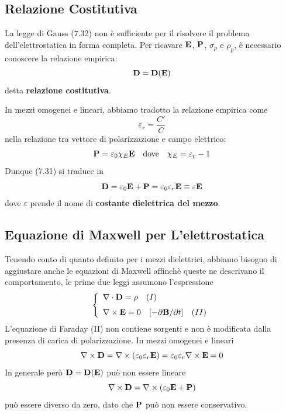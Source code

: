 \subsection{Relazione Costitutiva}

La legge di Gauss (7.32) non \`e sufficiente per il risolvere il problema dell'elettrostatica in forma completa. Per ricavare $\bold{E}$, $\bold{P}$, $\sigma_p$ e $\rho_p$, \`e necessario conoscere la relazione empirica:
\begin{equation*}
	\bold{D} = \bold{D}(\bold{E})
\end{equation*}
detta \textbf{relazione costitutiva}.

In mezzi omogenei e lineari, abbiamo tradotto la relazione empirica come 
\begin{equation*}
	\varepsilon_{r} = \frac{C'}{C}
\end{equation*}
nella relazione tra vettore di polarizzazione e campo elettrico:
\begin{equation*}
	\bold{P} = \varepsilon_0 \chi_{E} \bold{E} \quad \text{dove} \quad \chi_{E} = \varepsilon_{r} -1
\end{equation*}
Dunque (7.31) si traduce in 
\begin{equation*}
	\bold{D} = \varepsilon_0 \bold{E} + \bold{P} = \varepsilon_0 \varepsilon_r \bold{E} \equiv \varepsilon \bold{E}
\end{equation*}
dove $\varepsilon$ prende il nome di \textbf{costante dielettrica del mezzo}.

\subsection{Equazione di Maxwell per L'elettrostatica}
Tenendo conto di quanto definito per i mezzi dielettrici, abbiamo bisogno di aggiustare anche le equazioni di Maxwell affinch\`e queste ne descrivano il comportamento, le prime due leggi assumono l'espressione 
\begin{equation*}
	\left \{ \begin{array}{l}
		\nabla \cdot \bold{D} = \rho \quad (I)\\ \rule{0pt}{15pt}
		\nabla \times \bold{E} = 0 \quad [- \partial \bold{B} / \partial t] \quad (II)
	\end{array} \right.
\end{equation*}
L'equazione di Faraday (II) non contiene sorgenti e non \`e modificata dalla presenza di carica di polarizzazione. In mezzi omogenei e lineari 
\begin{equation*}
	\nabla \times \bold{D} = \nabla \times (\varepsilon_0 \varepsilon_r \bold{E}) = \varepsilon_0 \varepsilon_r \nabla \times \bold{E} = 0
\end{equation*}
In generale per\`o $\bold{D} = \bold{D}(\bold{E})$ pu\`o non essere lineare 
\begin{equation*}
	\nabla \times \bold{D} = \nabla \times (\varepsilon_0 \bold{E} + \bold{P})
\end{equation*}
pu\`o essere diverso da zero, dato che $\bold{P}$ pu\`o non essere conservativo.

